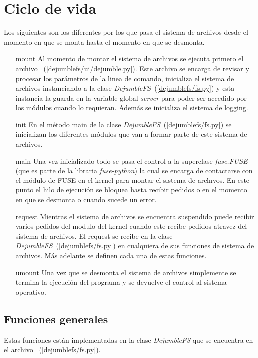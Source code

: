 \section{Ciclo de vida}

Los siguientes son los diferentes por los que pasa el sistema de archivos desde el momento en que se monta hasta el momento en que se desmonta.

\begin{itemize}
\item[mount] Al momento de montar el sistema de archivos se ejecuta primero el archivo ~(\ref{dejumblefs/ui/dejumble.py}). Este archivo se encarga de revisar y procesar los parámetros de la linea de comando, inicializa el sistema de archivos instanciando a la clase \textit{DejumbleFS}~(\ref{dejumblefs/fs.py}) y esta instancia la guarda en la variable global \textit{server} para poder ser accedido por los módulos cuando lo requieran. Además se inicializa el sistema de logging.
\item[init] En el método main de la clase \textit{DejumbleFS}~(\ref{dejumblefs/fs.py}) se inicializan los diferentes módulos que van a formar parte de este sistema de archivos.
\item[main] Una vez inicializado todo se pasa el control a la superclase \textit{fuse.FUSE} (que es parte de la libraria \textit{fuse-python}) la cual se encarga de contactarse con el módulo de FUSE en el kernel para montar el sistema de archivos. En este punto el hilo de ejecución se bloquea hasta recibir pedidos o en el momento en que se desmonta o cuando sucede un error.
\item[request] Mientras el sistema de archivos se encuentra suspendido puede recibir varios pedidos del modulo del kernel cuando este recibe pedidos atravez del sistema de archivos. El request se recibe en la clase \textit{DejumbleFS}~(\ref{dejumblefs/fs.py}) en cualquiera de sus funciones de sistema de archivos. Más adelante se definen cada una de estas funciones.
\item[umount] Una vez que se desmonta el sistema de archivos simplemente se termina la ejecución del programa y se devuelve el control al sistema operativo.
\end{itemize}

\subsection{Funciones generales}

Estas funciones están implementadas en la clase \textit{DejumbleFS} que se encuentra en el archivo ~(\ref{dejumblefs/fs.py}). 

